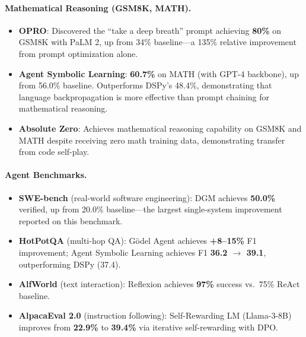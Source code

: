 \paragraph{Mathematical Reasoning (GSM8K, MATH).}
\begin{itemize}
    \item \textbf{OPRO}: Discovered the ``take a deep breath'' prompt achieving \textbf{80\%} on GSM8K with PaLM 2, up from 34\% baseline---a 135\% relative improvement from prompt optimization alone.
    \item \textbf{Agent Symbolic Learning}: \textbf{60.7\%} on MATH (with GPT-4 backbone), up from 56.0\% baseline. Outperforms DSPy's 48.4\%, demonstrating that language backpropagation is more effective than prompt chaining for mathematical reasoning.
    \item \textbf{Absolute Zero}: Achieves mathematical reasoning capability on GSM8K and MATH despite receiving zero math training data, demonstrating transfer from code self-play.
\end{itemize}

\paragraph{Agent Benchmarks.}
\begin{itemize}
    \item \textbf{SWE-bench} (real-world software engineering): DGM achieves \textbf{50.0\%} verified, up from 20.0\% baseline---the largest single-system improvement reported on this benchmark.
    \item \textbf{HotPotQA} (multi-hop QA): G\"{o}del Agent achieves \textbf{+8--15\%} F1 improvement; Agent Symbolic Learning achieves F1 \textbf{36.2 $\rightarrow$ 39.1}, outperforming DSPy (37.4).
    \item \textbf{AlfWorld} (text interaction): Reflexion achieves \textbf{97\%} success vs.\ 75\% ReAct baseline.
    \item \textbf{AlpacaEval 2.0} (instruction following): Self-Rewarding LM (Llama-3-8B) improves from \textbf{22.9\%} to \textbf{39.4\%} via iterative self-rewarding with DPO.
\end{itemize}

